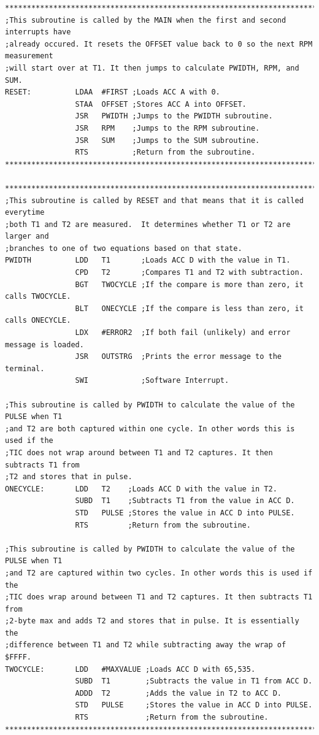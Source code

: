 \documentclass[12pt]{report}
\begin{document}
\begin{Verbatim}[frame=single, fontsize=\footnotesize]
****************************************************************************************
;This subroutine is called by the MAIN when the first and second interrupts have
;already occured. It resets the OFFSET value back to 0 so the next RPM measurement
;will start over at T1. It then jumps to calculate PWIDTH, RPM, and SUM.
RESET:          LDAA  #FIRST ;Loads ACC A with 0.
                STAA  OFFSET ;Stores ACC A into OFFSET.
                JSR   PWIDTH ;Jumps to the PWIDTH subroutine.
                JSR   RPM    ;Jumps to the RPM subroutine.
                JSR   SUM    ;Jumps to the SUM subroutine.
                RTS          ;Return from the subroutine.
****************************************************************************************

****************************************************************************************
;This subroutine is called by RESET and that means that it is called everytime
;both T1 and T2 are measured.  It determines whether T1 or T2 are larger and
;branches to one of two equations based on that state.
PWIDTH          LDD   T1       ;Loads ACC D with the value in T1.
                CPD   T2       ;Compares T1 and T2 with subtraction.
                BGT   TWOCYCLE ;If the compare is more than zero, it calls TWOCYCLE.
                BLT   ONECYCLE ;If the compare is less than zero, it calls ONECYCLE.
                LDX   #ERROR2  ;If both fail (unlikely) and error message is loaded.
                JSR   OUTSTRG  ;Prints the error message to the terminal.
                SWI            ;Software Interrupt.
                
;This subroutine is called by PWIDTH to calculate the value of the PULSE when T1
;and T2 are both captured within one cycle. In other words this is used if the
;TIC does not wrap around between T1 and T2 captures. It then subtracts T1 from
;T2 and stores that in pulse.
ONECYCLE:       LDD   T2    ;Loads ACC D with the value in T2.
                SUBD  T1    ;Subtracts T1 from the value in ACC D.
                STD   PULSE ;Stores the value in ACC D into PULSE.
                RTS         ;Return from the subroutine.

;This subroutine is called by PWIDTH to calculate the value of the PULSE when T1
;and T2 are captured within two cycles. In other words this is used if the
;TIC does wrap around between T1 and T2 captures. It then subtracts T1 from
;2-byte max and adds T2 and stores that in pulse. It is essentially the
;difference between T1 and T2 while subtracting away the wrap of $FFFF.
TWOCYCLE:       LDD   #MAXVALUE ;Loads ACC D with 65,535.
                SUBD  T1        ;Subtracts the value in T1 from ACC D.
                ADDD  T2        ;Adds the value in T2 to ACC D.
                STD   PULSE     ;Stores the value in ACC D into PULSE.
                RTS             ;Return from the subroutine.
****************************************************************************************


\end{Verbatim}
\end{document}
